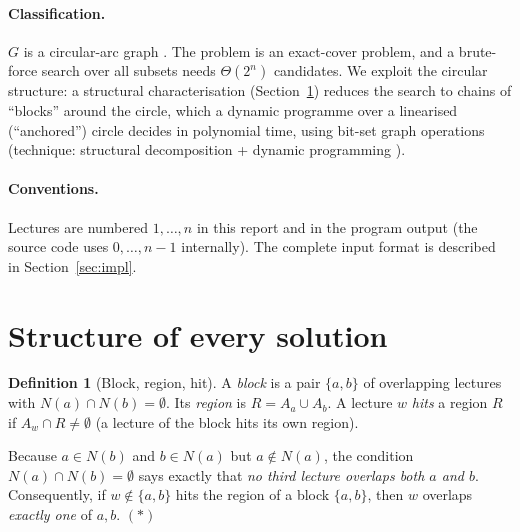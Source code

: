 \documentclass[11pt,a4paper]{article}
\theoremstyle{definition}
\newtheorem{definition}{Definition}
\theoremstyle{remark}
\begin{document}
\paragraph{Classification.} $G$ is a circular-arc graph \cite{golumbic}.  The problem is
an exact-cover problem, and a brute-force search over all subsets needs $\Theta(2^n)$
candidates.  We exploit the circular structure: a structural characterisation
(Section~\ref{sec:structure}) reduces the search to chains of ``blocks'' around the
circle, which a dynamic programme over a linearised (``anchored'') circle decides in
polynomial time, using bit-set graph operations (technique: structural decomposition
+ dynamic programming \cite{clrs}).

\paragraph{Conventions.} Lectures are numbered $1,\dots,n$ in this report and in the
program output (the source code uses $0,\dots,n-1$ internally).  The complete input
format is described in Section~\ref{sec:impl}.

\section{Structure of every solution}\label{sec:structure}
\begin{definition}[Block, region, hit]
A \emph{block} is a pair $\{a,b\}$ of overlapping lectures with
$N(a)\cap N(b)=\emptyset$.  Its \emph{region} is $R=A_a\cup A_b$.  A lecture $w$
\emph{hits} a region $R$ if $A_w\cap R\ne\emptyset$ (a lecture of the block hits its
own region).
\end{definition}
Because $a\in N(b)$ and $b\in N(a)$ but $a\notin N(a)$, the condition
$N(a)\cap N(b)=\emptyset$ says exactly that \emph{no third lecture overlaps both $a$
and $b$}.  Consequently, if $w\notin\{a,b\}$ hits the region of a block $\{a,b\}$, then $w$
overlaps \emph{exactly one} of $a,b$.  $(\ast)$
\end{document}

